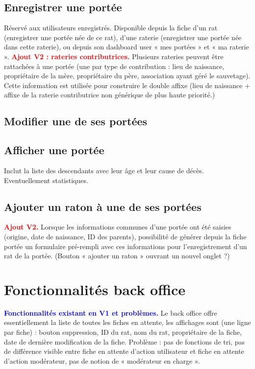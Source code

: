\documentclass[a4paper,10pt]{article}
\newcommand\existant[1]{\noindent\textbf{\textcolor{blue}{#1}}}
\newcommand\desire[1]{\noindent\textbf{\textcolor{red}{#1}}}
\begin{document}
\subsection{Enregistrer une portée}
Réservé aux utilisateurs enregistrés. Disponible depuis la fiche d'un rat (enregistrer une portée née de ce rat), d'une raterie (enregistrer une portée née dans cette raterie), ou depuis son dashboard user « mes portées » et « ma raterie ». \desire{Ajout V2 : rateries contributrices.} Plusieurs rateries peuvent être rattachées à une portée (une par type de contribution : lieu de naissance, propriétaire de la mère, propriétaire du père, association ayant géré le sauvetage). Cette information est utilisée pour construire le double affixe (lieu de naissance + affixe de la raterie contributrice non générique de plus haute priorité.)  

\subsection{Modifier une de ses portées} 

\subsection{Afficher une portée} 
Inclut la liste des descendants avec leur âge et leur cause de décès. Eventuellement statistiques.

\subsection{Ajouter un raton à une de ses portées}
 
\desire{Ajout V2.} Lorsque les informations communes d'une portée ont été saisies (origine, date de naissance, ID des parents), possibilité de générer depuis la fiche portée un formulaire pré-rempli avec ces informations pour l'enregistrement d'un rat de la portée. (Bouton « ajouter un raton » ouvrant un nouvel onglet ?)  

\section{Fonctionnalités back office}
\label{sec:backoffice}
\existant{Fonctionnalités existant en V1 et problèmes.} Le back office offre essentiellement la liste de toutes les fiches en attente, les affichages sont (une ligne par fiche) : bouton suppression, ID du rat, nom du rat, propriétaire de la fiche, date de dernière modification de la fiche. Problème : pas de fonctions de tri, pas de différence visible entre fiche en attente d'action utilisateur et fiche en attente d'action modérateur, pas de notion de « modérateur en charge ».  
\end{document}
